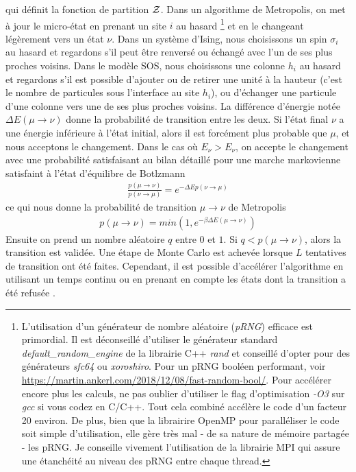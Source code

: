 qui définit la fonction de partition $\mathcal{Z}$. Dans un algorithme de Metropolis, on met à jour le micro-état en prenant un site $i$ au hasard
\footnote{L'utilisation d'un générateur de nombre aléatoire (\textit{pRNG}) efficace est primordial. Il est déconseillé d'utiliser le générateur standard \textit{default\_random\_engine} de la librairie C++ \textit{rand} et conseillé d'opter pour des générateurs \textit{sfc64} ou \textit{xoroshiro}. Pour un pRNG booléen performant, voir \url{https://martin.ankerl.com/2018/12/08/fast-random-bool/}. Pour accélérer encore plus les calculs, ne pas oublier d'utiliser le flag d'optimisation \textit{-O3}  sur \textit{gcc} si vous codez en C/C++. Tout cela combiné accélère le code d'un facteur 20 environ. \newline
De plus, bien que la librairire OpenMP pour paralléliser le code soit simple d'utilisation, elle gère très mal - de sa nature de mémoire partagée - les pRNG. Je conseille vivement l'utilisation de la librairie MPI qui assure une étanchéité au niveau des pRNG entre chaque thread.} 
et en le changeant légèrement vers un état $\nu$. Dans un système d'Ising, nous choisissons un spin $\sigma_i$ au hasard et regardons s'il peut être renversé ou échangé avec l'un de ses plus proches voisins. Dans le modèle SOS, nous choisissons une colonne $h_i$ au hasard et regardons s'il est possible d'ajouter ou de retirer une unité à la hauteur (c'est le nombre de particules sous l'interface au site $h_i$), ou d'échanger une particule d'une colonne vers une de ses plus proches voisins.
La différence d'énergie notée $\Delta E(\mu \rightarrow \nu)$ donne la probabilité de transition entre les deux. Si l'état final $\nu$ a une énergie inférieure à l'état initial, alors il est forcément plus probable que $\mu$, et nous acceptons le changement. Dans le cas où $E_\nu \greater E_\nu$, on accepte le changement avec une probabilité satisfaisant au bilan détaillé pour une marche markovienne satisfaint à l'état d'équilibre de Botlzmann
\begin{align}
\frac{p(\mu \rightarrow \nu)}{p(\nu \rightarrow \mu)} = e^{-\Delta Ep(\nu \rightarrow \mu)}
\end{align}
ce qui nous donne la probabilité de transition $\mu \to \nu$ de Metropolis
\begin{align}
	p(\mu \rightarrow \nu) = min(1,e^{-\beta \Delta E(\mu \rightarrow \nu)})
\end{align}
Ensuite on prend un nombre aléatoire $q$ entre $0$ et $1$. Si $q < p(\mu \rightarrow \nu)$, alors la transition est validée. Une étape de Monte Carlo est achevée lorsque $L$ tentatives de transition ont été faites. Cependant, il est possible d'accélérer l'algorithme en utilisant un temps continu \cite{newman_monte_1999} ou en prenant en compte les états dont la transition a été refusée \cite{frenkel_speed-up_2004}.
